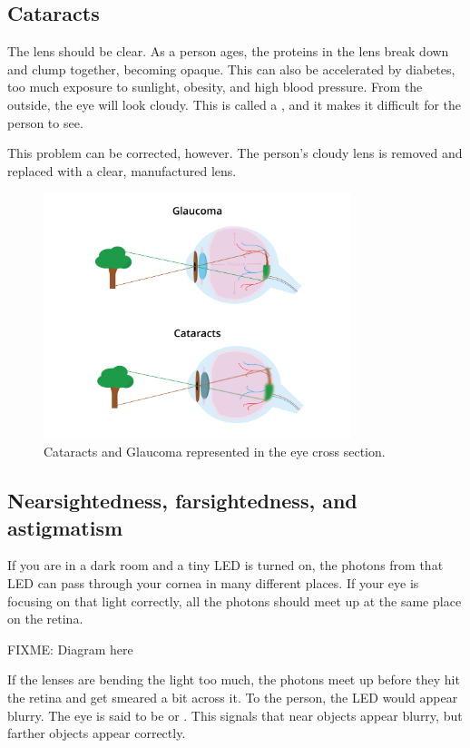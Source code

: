 \subsection{Cataracts}
The lens should be clear. As a person ages, the proteins in the lens break down and clump
together, becoming opaque. This can also be accelerated by diabetes, too much exposure to sunlight, obesity, and high blood pressure. 
From the outside, the eye will look cloudy. 
This is called a , and it makes it difficult for the person to see.

This problem can be corrected, however. The person's cloudy lens is removed and
replaced with a clear, manufactured lens.
\begin{figure}[htbp]
    \centering
    \includegraphics[width=0.8\textwidth]{cataractGlaucoma.png}
    \caption{Cataracts and Glaucoma represented in the eye cross section.}
    \label{fig:cataractGlaucoma}
\end{figure}

\subsection{Nearsightedness, farsightedness, and astigmatism}
If you are in a dark room and a tiny LED is turned on, the photons
from that LED can pass through your cornea in many different places.
If your eye is focusing on that light correctly, all the photons
should meet up at the same place on the retina.

FIXME: Diagram here

If the lenses are bending the light too much, the photons meet up before they hit the
retina and get smeared a bit across it. To the person, the LED
would appear blurry. The eye is said to be  or
. This signals that near objects appear blurry, but farther objects appear correctly. 

